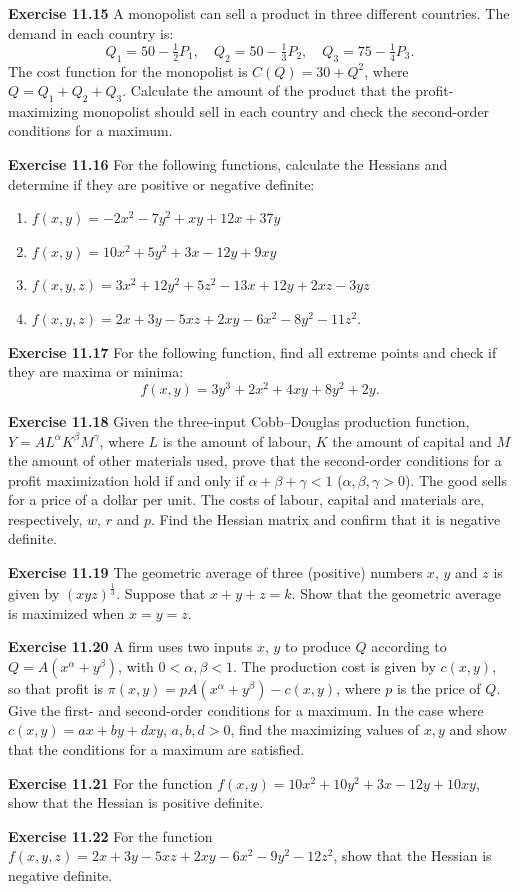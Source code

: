 \begin{original}
\textbf{Exercise 11.15} A monopolist can sell a product in three different countries. The demand in each country is:
\[
Q_1 = 50 - \tfrac{1}{2}P_1, \quad Q_2 = 50 - \tfrac{1}{3}P_2, \quad Q_3 = 75 - \tfrac{1}{4}P_3.
\]
The cost function for the monopolist is $C(Q) = 30 + Q^2$, where $Q = Q_1 + Q_2 + Q_3$. Calculate the amount of the product that the profit-maximizing monopolist should sell in each country and check the second-order conditions for a maximum.

\textbf{Exercise 11.16} For the following functions, calculate the Hessians and determine if they are positive or negative definite:
\begin{enumerate}
\item[(a)] $f(x, y) = -2x^2 - 7y^2 + xy + 12x + 37y$
\item[(b)] $f(x, y) = 10x^2 + 5y^2 + 3x - 12y + 9xy$
\item[(c)] $f(x, y, z) = 3x^2 + 12y^2 + 5z^2 - 13x + 12y + 2xz - 3yz$
\item[(d)] $f(x, y, z) = 2x + 3y - 5xz + 2xy - 6x^2 - 8y^2 - 11z^2$.
\end{enumerate}

\textbf{Exercise 11.17} For the following function, find all extreme points and check if they are maxima or minima:
\[
f(x, y) = 3y^3 + 2x^2 + 4xy + 8y^2 + 2y.
\]

\textbf{Exercise 11.18} Given the three-input Cobb--Douglas production function, $Y = A L^\alpha K^\beta M^\gamma$, where $L$ is the amount of labour, $K$ the amount of capital and $M$ the amount of other materials used, prove that the second-order conditions for a profit maximization hold if and only if $\alpha + \beta + \gamma < 1$ ($\alpha,\beta,\gamma > 0$). The good sells for a price of a dollar per unit. The costs of labour, capital and materials are, respectively, $w$, $r$ and $p$. Find the Hessian matrix and confirm that it is negative definite.

\textbf{Exercise 11.19} The geometric average of three (positive) numbers $x$, $y$ and $z$ is given by $(xyz)^{\frac{1}{3}}$. Suppose that $x + y + z = k$. Show that the geometric average is maximized when $x = y = z$.

\textbf{Exercise 11.20} A firm uses two inputs $x$, $y$ to produce $Q$ according to $Q = A(x^\alpha + y^\beta)$, with $0 < \alpha, \beta < 1$. The production cost is given by $c(x, y)$, so that profit is $\pi(x, y) = pA(x^\alpha + y^\beta) - c(x, y)$, where $p$ is the price of $Q$. Give the first- and second-order conditions for a maximum. In the case where $c(x, y) = ax + by + dxy$, $a, b, d > 0$, find the maximizing values of $x, y$ and show that the conditions for a maximum are satisfied.

\textbf{Exercise 11.21} For the function $f(x, y) = 10x^2 + 10y^2 + 3x - 12y + 10xy$, show that the Hessian is positive definite.

\textbf{Exercise 11.22} For the function $f(x, y, z) = 2x + 3y - 5xz + 2xy - 6x^2 - 9y^2 - 12z^2$, show that the Hessian is negative definite.
\end{original}
